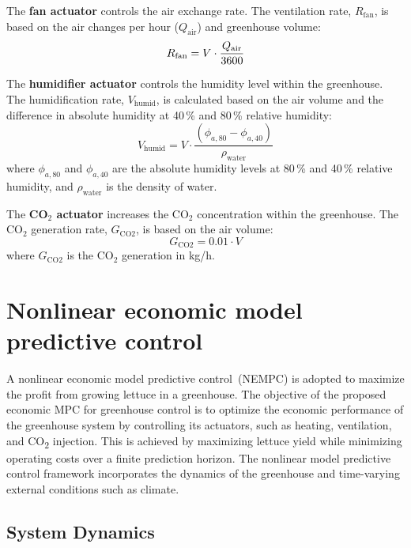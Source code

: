 \documentclass[conference]{IEEEtran}
\begin{document}
The \textbf{fan actuator} controls the air exchange rate. The ventilation rate, \( R_{\text{fan}} \), is based on the air changes per hour (\( Q_{\text{air}} \)) and greenhouse volume:
\begin{equation}
    R_{\text{fan}} = V \cdot \frac{\text{\( Q_{\text{air}} \)}}{3600}
\end{equation}

The \textbf{humidifier actuator} controls the humidity level within the greenhouse. The humidification rate, \( V_{\text{humid}} \), is calculated based on the air volume and the difference in absolute humidity at 40\,\% and 80\,\% relative humidity:
\begin{equation}
    V_{\text{humid}} = V \cdot \frac{(\phi_{a, 80} - \phi_{a, 40})}{\rho_{\text{water}}}
\end{equation}
where \( \phi_{a, 80} \) and \( \phi_{a, 40} \) are the absolute humidity levels at 80\,\% and 40\,\% relative humidity, and \( \rho_{\text{water}} \) is the density of water.

The \textbf{CO$_2$ actuator} increases the CO$_2$ concentration within the greenhouse. The CO$_2$ generation rate, \( G_{\text{CO2}} \), is based on the air volume:
\begin{equation}
    G_{\text{CO2}} = 0.01 \cdot V
\end{equation}
where \( G_{\text{CO2}} \) is the CO$_2$ generation in kg/h.


\section{Nonlinear economic model predictive control}\label{sec:mpc}
A nonlinear economic model predictive control~(NEMPC) is adopted to maximize the profit from growing lettuce in a greenhouse. The objective of the proposed economic MPC for greenhouse control is to optimize the economic performance of the greenhouse system by controlling its actuators, such as heating, ventilation, and CO\textsubscript{2} injection. This is achieved by maximizing lettuce yield while minimizing operating costs over a finite prediction horizon. The nonlinear model predictive control framework incorporates the dynamics of the greenhouse and time-varying external conditions such as climate.

\subsection{System Dynamics}\label{subsec:mpc_dynamics}
\end{document}
